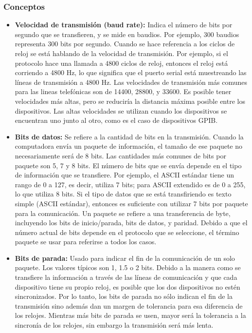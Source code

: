 \subsubsection{Conceptos} %
\label{ssub:conceptos}

\begin{itemize}
	\item \textbf{Velocidad de transmisión (baud rate):} Indica el número de bits por segundo que se transfieren, y se mide en baudios. Por ejemplo, 300 baudios representa 300 bits por segundo. Cuando se hace referencia a los ciclos de reloj se está hablando de la velocidad de transmisión. Por ejemplo, si el protocolo hace una llamada a 4800 ciclos de reloj, entonces el reloj está corriendo a 4800 Hz, lo que significa que el puerto serial está muestreando las líneas de transmisión a 4800 Hz. Las velocidades de transmisión más comunes para las lineas telefónicas son de 14400, 28800, y 33600. Es posible tener velocidades más altas, pero se reduciría la distancia máxima posible entre los dispositivos. Las altas velocidades se utilizan cuando los dispositivos se encuentran uno junto al otro, como es el caso de dispositivos GPIB.
	\item \textbf{Bits de datos:} Se refiere a la cantidad de bits en la transmisión. Cuando la computadora envía un paquete de información, el tamaño de ese paquete no necesariamente será de 8 bits. Las cantidades más comunes de bits por paquete son 5, 7 y 8 bits. El número de bits que se envía depende en el tipo de información que se transfiere. Por ejemplo, el ASCII estándar tiene un rango de 0 a 127, es decir, utiliza 7 bits; para ASCII extendido es de 0 a 255, lo que utiliza 8 bits. Si el tipo de datos que se está transfiriendo es texto simple (ASCII estándar), entonces es suficiente con utilizar 7 bits por paquete para la comunicación. Un paquete se refiere a una transferencia de byte, incluyendo los bits de inicio/parada, bits de datos, y paridad. Debido a que el número actual de bits depende en el protocolo que se seleccione, el término paquete se usar para referirse a todos los casos.
	\item \textbf{Bits de parada:} Usado para indicar el fin de la comunicación de un solo paquete. Los valores típicos son 1, 1.5 o 2 bits. Debido a la manera como se transfiere la información a través de las líneas de comunicación y que cada dispositivo tiene su propio reloj, es posible que los dos dispositivos no estén sincronizados. Por lo tanto, los bits de parada no sólo indican el fin de la transmisión sino además dan un margen de tolerancia para esa diferencia de los relojes. Mientras más bits de parada se usen, mayor será la tolerancia a la sincronía de los relojes, sin embargo la transmisión será más lenta.

\end{itemize}
